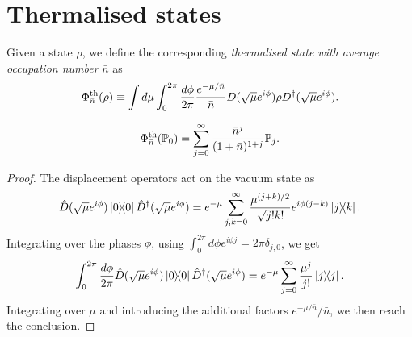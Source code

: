 \documentclass[12pt]{report}
\newcommand{\PP}{\mathbb{P}}
\begin{document}
\section{Thermalised states}

\begin{defn}
	Given a state $\rho$, we define the corresponding \emph{thermalised state with average occupation number} $\bar n$ as
	\begin{equation}
		\Phi_{\bar n}^{\rm th}(\rho)
		\equiv \int d\mu\int_0^{2\pi} \frac{d\phi}{2\pi} \frac{e^{-\mu/\bar n}}{\bar n}
		D(\sqrt\mu e^{i\phi})\rho D^\dagger(\sqrt\mu e^{i\phi}).
	\end{equation}
\end{defn}

\begin{prop}\label{prop:thermalisation_applied_to_00}
	\begin{equation}
		\Phi^{\rm th}_{\bar n}(\PP_0)
		= \sum_{j=0}^\infty \frac{\bar n^j}{(1+\bar n)^{1+j}} \PP_j.
	\end{equation}
\end{prop}
\begin{proof}
	The displacement operators act on the vacuum state as
	\begin{equation}
		\hat D(\sqrt\mu e^{i\phi})\ketbra0 \hat D^\dagger(\sqrt\mu e^{i\phi})
		= e^{-\mu} \sum_{j,k=0}^\infty \frac{\mu^{(j+k)/2}}{\sqrt{j!k!}} e^{i\phi(j-k)} \ketbra{j}{k}.
	\end{equation}
	Integrating over the phases $\phi$, using $\int_0^{2\pi}d\phi e^{i\phi j}=2\pi \delta_{j,0}$, we get
	\begin{equation}
		\int_0^{2\pi} \frac{d\phi}{2\pi}
		\hat D(\sqrt\mu e^{i\phi})\ketbra0 \hat D^\dagger(\sqrt\mu e^{i\phi})
		= e^{-\mu} \sum_{j=0}^\infty \frac{\mu^j}{j!} \ketbra j.
	\end{equation}
	Integrating over $\mu$ and introducing the additional factors $e^{-\mu/\bar n}/\bar n$, we then reach the conclusion.
\end{proof}
\end{document}

